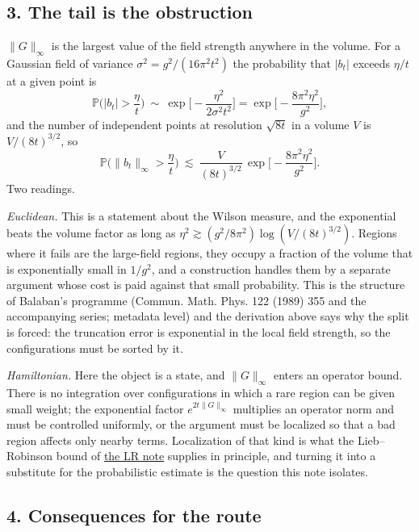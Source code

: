 \documentclass[11pt,a4paper]{article}
\begin{document}
\hypertarget{the-tail-is-the-obstruction}{%
\subsection{3. The tail is the
obstruction}\label{the-tail-is-the-obstruction}}

\(\|G\|_\infty\) is the largest value of the field strength anywhere in
the volume. For a Gaussian field of variance
\(\sigma^2=g^2/(16\pi^2t^2)\) the probability that \(|b_t|\) exceeds
\(\eta/t\) at a given point is
\[\mathbb P\Big(|b_t|>\frac\eta t\Big)\ \sim\ \exp\Big[-\frac{\eta^2}{2\sigma^2t^2}\Big]
=\exp\Big[-\frac{8\pi^2\eta^2}{g^2}\Big],\] and the number of
independent points at resolution \(\sqrt{8t}\) in a volume \(V\) is
\(V/(8t)^{3/2}\), so
\[\mathbb P\Big(\|b_t\|_\infty>\frac\eta t\Big)\ \lesssim\ \frac{V}{(8t)^{3/2}}\,
\exp\Big[-\frac{8\pi^2\eta^2}{g^2}\Big].\] Two readings.

\emph{Euclidean.} This is a statement about the Wilson measure, and the
exponential beats the volume factor as long as
\(\eta^2\gtrsim(g^2/8\pi^2)\log(V/(8t)^{3/2})\). Regions where it fails
are the large-field regions, they occupy a fraction of the volume that
is exponentially small in \(1/g^2\), and a construction handles them by
a separate argument whose cost is paid against that small probability.
This is the structure of Balaban's programme (Commun. Math. Phys. 122
(1989) 355 and the accompanying series; metadata level) and the
derivation above says why the split is forced: the truncation error is
exponential in the local field strength, so the configurations must be
sorted by it.

\emph{Hamiltonian.} Here the object is a state, and \(\|G\|_\infty\)
enters an operator bound. There is no integration over configurations in
which a rare region can be given small weight; the exponential factor
\(e^{2t\|G\|_\infty}\) multiplies an operator norm and must be
controlled uniformly, or the argument must be localized so that a bad
region affects only nearby terms. Localization of that kind is what the
Lieb--Robinson bound of \href{lieb-robinson-kogut-susskind.md}{the LR
note} supplies in principle, and turning it into a substitute for the
probabilistic estimate is the question this note isolates.

\hypertarget{consequences-for-the-route}{%
\subsection{4. Consequences for the
route}\label{consequences-for-the-route}}
\end{document}
